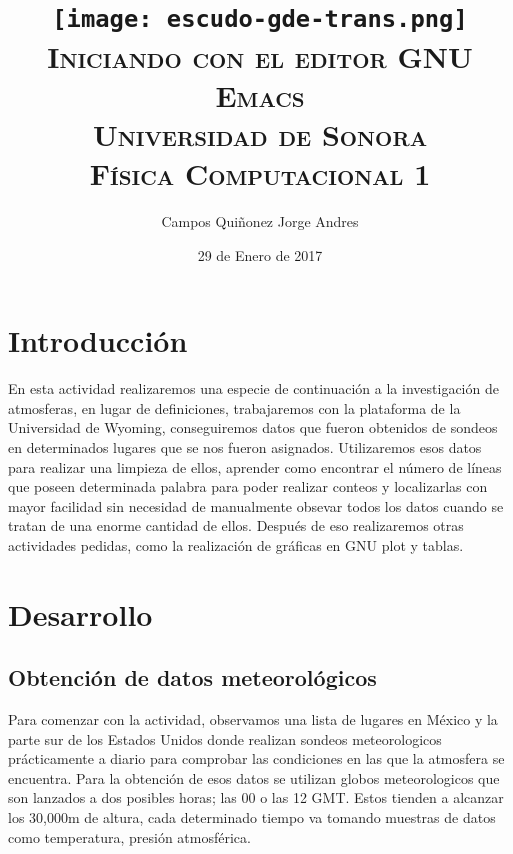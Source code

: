 \documentclass{article}
\begin{document}
\begin{doublespace}
\title{\texttt{[image: escudo-gde-trans.png]}\\ \textsc{\LARGE Iniciando con el editor GNU Emacs\\Universidad de Sonora\\Física Computacional 1}}
\author{\huge Campos Quiñonez Jorge Andres}
\date{\Large 29 de Enero de 2017}
\maketitle

\end{doublespace}

\newpage
\mbox{}
\thispagestyle{empty}
\newpage

\section{\huge Introducción}
\Large En esta actividad realizaremos una especie de continuación a la investigación de atmosferas, en lugar de definiciones, trabajaremos con la plataforma de la Universidad de Wyoming, conseguiremos datos que fueron obtenidos de sondeos en determinados lugares que se nos fueron asignados. Utilizaremos esos datos para realizar una limpieza de ellos, aprender como encontrar el número de líneas que poseen determinada palabra para poder realizar conteos y localizarlas con mayor facilidad sin necesidad de manualmente obsevar todos los datos cuando se tratan de una enorme cantidad de ellos. Después de eso realizaremos otras actividades pedidas, como la realización de gráficas en GNU plot y tablas.

\newpage
\section{\huge Desarrollo}
\subsection{\LARGE Obtención de datos meteorológicos}
Para comenzar con la actividad, observamos una lista de lugares en México y la parte sur de los Estados Unidos donde realizan sondeos meteorologicos prácticamente a diario para comprobar las condiciones en las que la atmosfera se encuentra.
Para la obtención de esos datos se utilizan globos meteorologicos que son lanzados a dos posibles horas; las 00 o las 12 GMT. Estos tienden a alcanzar los 30,000m de altura, cada determinado tiempo va tomando muestras de datos como temperatura, presión atmosférica.\\
\end{document}
